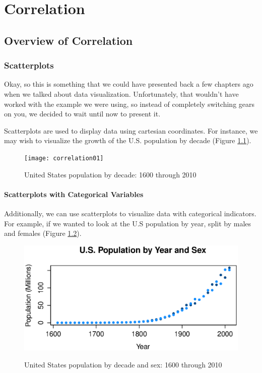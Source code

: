 
\chapter{Correlation}

\section{Overview of Correlation}

\subsection{Scatterplots}
Okay, so this is something that we could have presented back a few chapters ago when we talked about data visualization. Unfortunately, that wouldn't have worked with the example we were using, so instead of completely switching gears on you, we decided to wait until now to present it.

Scatterplots are used to display data using cartesian coordinates. For instance, we may wish to visualize the growth of the U.S. population by decade (Figure \ref{fig:correlation01}).

\begin{figure}
\texttt{[image: correlation01]}
\label{fig:correlation01}
\caption{United States population by decade: 1600 through 2010}
\end{figure}

\subsubsection{Scatterplots with Categorical Variables}
Additionally, we can use scatterplots to visualize data with categorical indicators. For example, if we wanted to look at the U.S population by year, split by males and females (Figure \ref{fig:correlation02}).

\begin{figure}
\includegraphics[width=35pc]{assets/correlation02}
\label{fig:correlation02}
\caption{United States population by decade and sex: 1600 through 2010}
\end{figure}


